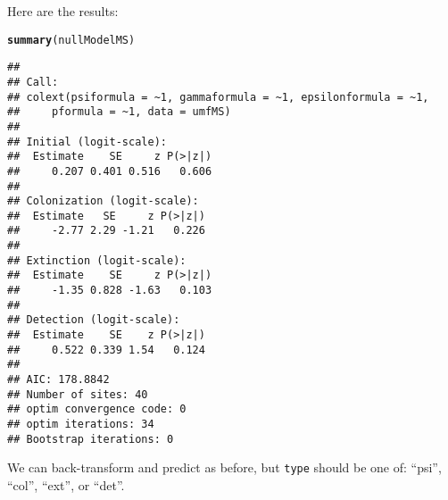 \documentclass[12pt]{article}\usepackage[]{graphicx}\usepackage[]{xcolor}
\makeatletter
\newcommand{\hlstd}[1]{\textcolor[rgb]{0.345,0.345,0.345}{#1}}%
\newcommand{\hlkwd}[1]{\textcolor[rgb]{0.737,0.353,0.396}{\textbf{#1}}}%
\newenvironment{kframe}{%
 \def\at@end@of@kframe{}%
 \ifinner\ifhmode%
  \def\at@end@of@kframe{\end{minipage}}%
  \begin{minipage}{\columnwidth}%
 \fi\fi%
 \def\FrameCommand##1{\hskip\@totalleftmargin \hskip-\fboxsep
 \colorbox{shadecolor}{##1}\hskip-\fboxsep
     \hskip-\linewidth \hskip-\@totalleftmargin \hskip\columnwidth}%
 \MakeFramed {\advance\hsize-\width
   \@totalleftmargin\z@ \linewidth\hsize
   \@setminipage}}%
 {\par\unskip\endMakeFramed%
 \at@end@of@kframe}
\newenvironment{knitrout}{}{} %
\makeatother
\begin{document}
Here are the results:

\begin{knitrout}
\color{fgcolor}\begin{kframe}
\begin{alltt}
\hlkwd{summary}\hlstd{(nullModelMS)}
\end{alltt}
\begin{verbatim}
## 
## Call:
## colext(psiformula = ~1, gammaformula = ~1, epsilonformula = ~1, 
##     pformula = ~1, data = umfMS)
## 
## Initial (logit-scale):
##  Estimate    SE     z P(>|z|)
##     0.207 0.401 0.516   0.606
## 
## Colonization (logit-scale):
##  Estimate   SE     z P(>|z|)
##     -2.77 2.29 -1.21   0.226
## 
## Extinction (logit-scale):
##  Estimate    SE     z P(>|z|)
##     -1.35 0.828 -1.63   0.103
## 
## Detection (logit-scale):
##  Estimate    SE    z P(>|z|)
##     0.522 0.339 1.54   0.124
## 
## AIC: 178.8842 
## Number of sites: 40
## optim convergence code: 0
## optim iterations: 34 
## Bootstrap iterations: 0
\end{verbatim}
\end{kframe}
\end{knitrout}

We can back-transform and predict as before, but \texttt{type} should
be one of: ``psi'', ``col'', ``ext'', or ``det''.
\end{document}
